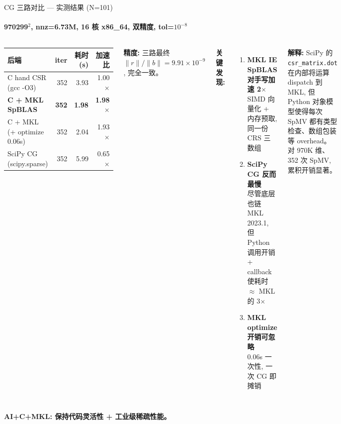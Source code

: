 \documentclass[12pt,aspectratio=169]{beamer}
\begin{document}
\begin{frame}[shrink]{CG 三路对比 — 实测结果 (N=101)}
\framesubtitle{970299$^2$, nnz=6.73M, 16 核 x86\_64, 双精度, tol=$10^{-8}$}

\begin{columns}[T]
\footnotesize
\begin{center}
\renewcommand{\arraystretch}{1.25}
\begin{tabular}{@{}l r r r@{}}
\toprule
\textbf{后端} & \textbf{iter} & \textbf{耗时(s)} & \textbf{加速比} \\
\midrule
C hand CSR (gcc -O3) & 352 & 3.93 & 1.00$\times$ \\
\textbf{C + MKL SpBLAS} & \textbf{352} & \textbf{1.98} & \textbf{1.98}$\times$ \\
C + MKL (+ optimize 0.06s) & 352 & 2.04 & 1.93$\times$ \\
SciPy CG (scipy.sparse) & 352 & 5.99 & 0.65$\times$ \\
\bottomrule
\end{tabular}
\end{center}
\normalsize

\vspace{4pt}
\small
\textbf{精度:} 三路最终 $\|r\|/\|b\| = 9.91\times 10^{-9}$, 完全一致。

\textbf{关键发现:}

\vspace{2pt}
\begin{enumerate}\itemsep3pt
  \item \textbf{MKL IE SpBLAS 对手写加速 2$\times$}\\
  {\footnotesize SIMD 向量化 + 内存预取, 同一份 CRS 三数组}

  \item \textbf{SciPy CG 反而最慢}\\
  {\footnotesize 尽管底层也链 MKL 2023.1, 但 Python 调用开销 + callback 使耗时 $\approx$ MKL 的 3$\times$}

  \item \textbf{MKL optimize 开销可忽略}\\
  {\footnotesize 0.06s 一次性, 一次 CG 即摊销}
\end{enumerate}

\vspace{2pt}
\small
\textbf{解释:} SciPy 的 \texttt{csr\_matrix.dot} 在内部将运算 dispatch 到 MKL, 但 Python 对象模型使得每次 SpMV 都有类型检查、数组包装等 overhead。对 970K 维、352 次 SpMV, 累积开销显著。
\end{columns}

\vspace{4pt}
\begin{center}
\small \textbf{AI+C+MKL: 保持代码灵活性 + 工业级稀疏性能。}
\end{center}
\end{frame}
\end{document}

